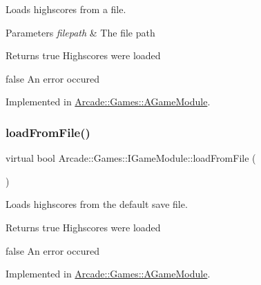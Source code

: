 Loads highscores from a file. 


\begin{DoxyParams}{Parameters}
{\em filepath} & The file path \\
\hline
\end{DoxyParams}
\begin{DoxyReturn}{Returns}
true Highscores were loaded 

false An error occured 
\end{DoxyReturn}


Implemented in \mbox{\hyperlink{classArcade_1_1Games_1_1AGameModule_a1f7e26d79d4c392458407edfe934ff5f}{Arcade\+::\+Games\+::\+A\+Game\+Module}}.

\mbox{\label{classArcade_1_1Games_1_1IGameModule_add4c3468c03cc41fde2baf671a4bd026}} 
\subsubsection{\texorpdfstring{loadFromFile()}{loadFromFile()}\hspace{0.1cm}{\footnotesize\ttfamily [2/2]}}
{\footnotesize\ttfamily virtual bool Arcade\+::\+Games\+::\+I\+Game\+Module\+::load\+From\+File (\begin{DoxyParamCaption}{ }\end{DoxyParamCaption})\hspace{0.3cm}{\ttfamily [pure virtual]}}



Loads highscores from the default save file. 

\begin{DoxyReturn}{Returns}
true Highscores were loaded 

false An error occured 
\end{DoxyReturn}


Implemented in \mbox{\hyperlink{classArcade_1_1Games_1_1AGameModule_a61be4a5123cb5933b10fa0a4c34d8b06}{Arcade\+::\+Games\+::\+A\+Game\+Module}}.

\mbox{\label{classArcade_1_1Games_1_1IGameModule_afd5ec66681e77038e3d4dc17f43e1ee9}} 

